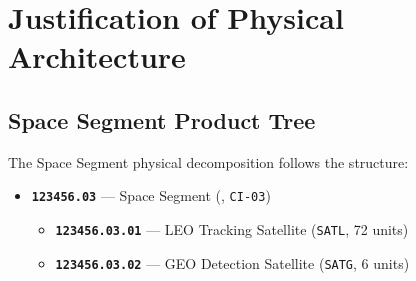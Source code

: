 \section{Justification of Physical Architecture}
\label{sec:physical_arch}

\subsection{Space Segment Product Tree}

The Space Segment physical decomposition follows the  structure:
\begin{itemize}
    \item \textbf{\texttt{123456.03}} --- Space Segment (, \texttt{CI-03})
    \begin{itemize}
        \item \textbf{\texttt{123456.03.01}} --- LEO Tracking Satellite (\texttt{SATL}, 72 units)
        \item \textbf{\texttt{123456.03.02}} --- GEO Detection Satellite (\texttt{SATG}, 6 units)
    \end{itemize}
\end{itemize}

